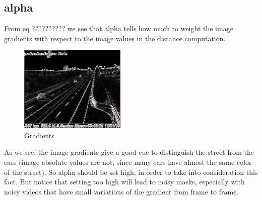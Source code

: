 \subsection*{alpha}
From eq ?????????? we see that alpha tells how much to weight the image gradients
with respect to the image values in the distance computation.
\begin{figure}[!t]
    \centering
    \includegraphics[width=0.45\textwidth]{Figures/gradients.jpg}
    \caption{Gradients}
    \label{fig:gradients}
\end{figure}
As we see, the image gradients give a good cue to distinguish the street from the cars
(image absolute values are not, since many cars have almost the same color of the
street). So alpha should be set high, in order to take into consideration this fact.
But notice that setting too high will lead to noisy masks, especially with noisy
videos that have small variations of the gradient from frame to frame.
